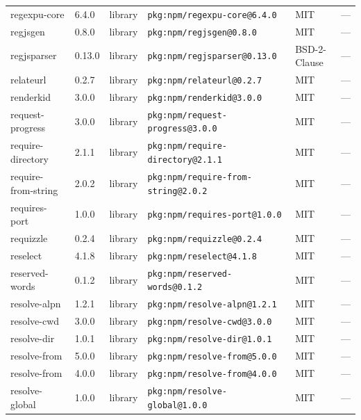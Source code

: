 \documentclass[11pt,a4paper]{article}
\begin{document}
\begin{longtable}{|p{4cm}|p{2cm}|p{1.6cm}|p{5cm}|p{1.5cm}|p{3.5cm}|}
\raggedright regexpu-core & 6.4.0 & library & \small\texttt{pkg:npm/regexpu-core@6.4.0} & MIT & \small — \\
\raggedright regjsgen & 0.8.0 & library & \small\texttt{pkg:npm/regjsgen@0.8.0} & MIT & \small — \\
\raggedright regjsparser & 0.13.0 & library & \small\texttt{pkg:npm/regjsparser@0.13.0} & BSD-2-Clause & \small — \\
\raggedright relateurl & 0.2.7 & library & \small\texttt{pkg:npm/relateurl@0.2.7} & MIT & \small — \\
\raggedright renderkid & 3.0.0 & library & \small\texttt{pkg:npm/renderkid@3.0.0} & MIT & \small — \\
\raggedright request-progress & 3.0.0 & library & \small\texttt{pkg:npm/request-progress@3.0.0} & MIT & \small — \\
\raggedright require-directory & 2.1.1 & library & \small\texttt{pkg:npm/require-directory@2.1.1} & MIT & \small — \\
\raggedright require-from-string & 2.0.2 & library & \small\texttt{pkg:npm/require-from-string@2.0.2} & MIT & \small — \\
\raggedright requires-port & 1.0.0 & library & \small\texttt{pkg:npm/requires-port@1.0.0} & MIT & \small — \\
\raggedright requizzle & 0.2.4 & library & \small\texttt{pkg:npm/requizzle@0.2.4} & MIT & \small — \\
\raggedright reselect & 4.1.8 & library & \small\texttt{pkg:npm/reselect@4.1.8} & MIT & \small — \\
\raggedright reserved-words & 0.1.2 & library & \small\texttt{pkg:npm/reserved-words@0.1.2} & MIT & \small — \\
\raggedright resolve-alpn & 1.2.1 & library & \small\texttt{pkg:npm/resolve-alpn@1.2.1} & MIT & \small — \\
\raggedright resolve-cwd & 3.0.0 & library & \small\texttt{pkg:npm/resolve-cwd@3.0.0} & MIT & \small — \\
\raggedright resolve-dir & 1.0.1 & library & \small\texttt{pkg:npm/resolve-dir@1.0.1} & MIT & \small — \\
\raggedright resolve-from & 5.0.0 & library & \small\texttt{pkg:npm/resolve-from@5.0.0} & MIT & \small — \\
\raggedright resolve-from & 4.0.0 & library & \small\texttt{pkg:npm/resolve-from@4.0.0} & MIT & \small — \\
\raggedright resolve-global & 1.0.0 & library & \small\texttt{pkg:npm/resolve-global@1.0.0} & MIT & \small — \\

\end{longtable}
\end{document}
